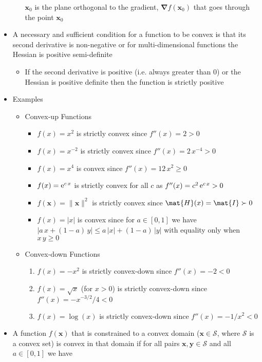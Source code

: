 \documentclass[11pt]{article}
\newcommand{\grad}{\bm{\nabla}}
\newcommand{\e}[1]{{\rm e}^{#1}}
\begin{document}
\begin{itemize}
\begin{itemize}
\(\bm{x}_0\) is the plane orthogonal to the gradient, \(\grad
       f(\bm{x}_0)\) that goes through the point \(\bm{x}_0\)
\end{itemize}
\item A necessary and sufficient condition for a function to be convex
is that its second derivative is non-negative or for
multi-dimensional functions the Hessian is positive semi-definite
\begin{itemize}
\item If the second derivative is positive (i.e. always greater
than 0) or the Hessian is positive definite then the function
is strictly positive
\end{itemize}
\item Examples
\begin{itemize}
\item Convex-up Functions
\begin{itemize}
\item \(f(x) = x^2\)  is strictly convex since \(f''(x)=2>0\)
\item \(f(x) = x^{-2}\)  is strictly convex since \(f''(x)=2\,x^{-4}>0\)
\item \(f(x) = x^4\)  is convex since \(f''(x)=12\,x^2\geq0\)
\item \(f(x) = \e{c\,x}\) is strictly convex for all \(c\) as \(f''(x)=c^2\,\e{c\,x}>0\)
\item \(f(\bm{x}) = \|\bm{x}\|^2\)  is strictly convex since \(\mat{H}(x)=\mat{I}\succ0\)
\item \(f(x) = |x|\) is convex since for \(a\in[0,1]\) we have \(|a\,x +
         (1-a)\,y| \leq a\,|x| + (1-a)\,|y|\) with equality only when
\(x\,y\geq 0\)
\end{itemize}
\item Convex-down Functions
\begin{enumerate}
\item \(f(x) = -x^2\)  is strictly convex-down since \(f''(x)=-2<0\)
\item \(f(x) = \sqrt{x}\)  (for \(x>0\)) is strictly convex-down since \(f''(x)=-x^{-3/2}/4<0\)
\item \(f(x) = \log(x)\)  is strictly convex-down since \(f''(x)=-1/x^2<0\)
\end{enumerate}
\end{itemize}
\item A function \(f(\bm{x})\) that is constrained to a convex domain
(\(\bm{x}\in\mathcal{S}\), where \(\mathcal{S}\) is a convex set) is
convex in that domain if for all pairs
\(\bm{x},\bm{y}\in\mathcal{S}\) and all \(a\in[0,1]\) we have

\end{itemize}
\end{document}
